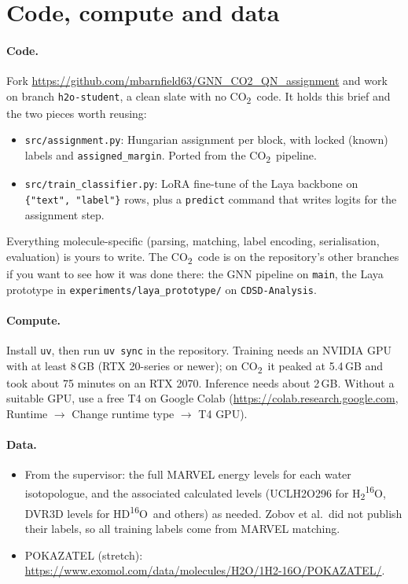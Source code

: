 \documentclass[11pt,a4paper]{article}
\newcommand{\water}{H\textsubscript{2}\textsuperscript{16}O}
\newcommand{\hdo}{HD\textsuperscript{16}O}
\newcommand{\cotwo}{CO\textsubscript{2}}
\begin{document}
\section{Code, compute and data}

\paragraph{Code.} Fork \url{https://github.com/mbarnfield63/GNN_CO2_QN_assignment} and work on branch \texttt{h2o-student}, a clean slate with no \cotwo\ code. It holds this brief and the two pieces worth reusing:
\begin{itemize}
  \item \texttt{src/assignment.py}: Hungarian assignment per block, with locked (known) labels and \texttt{assigned\_margin}. Ported from the \cotwo\ pipeline.
  \item \texttt{src/train\_classifier.py}: LoRA fine-tune of the Laya backbone on \texttt{\{"text", "label"\}} rows, plus a \texttt{predict} command that writes logits for the assignment step.
\end{itemize}
Everything molecule-specific (parsing, matching, label encoding, serialisation, evaluation) is yours to write. The \cotwo\ code is on the repository's other branches if you want to see how it was done there: the GNN pipeline on \texttt{main}, the Laya prototype in \texttt{experiments/laya\_prototype/} on \texttt{CDSD-Analysis}.

\paragraph{Compute.} Install \texttt{uv}, then run \texttt{uv sync} in the repository. Training needs an NVIDIA GPU with at least 8\,GB (RTX 20-series or newer); on \cotwo\ it peaked at 5.4\,GB and took about 75 minutes on an RTX 2070. Inference needs about 2\,GB. Without a suitable GPU, use a free T4 on Google Colab (\url{https://colab.research.google.com}, Runtime $\rightarrow$ Change runtime type $\rightarrow$ T4 GPU).

\paragraph{Data.}
\begin{itemize}
  \item From the supervisor: the full MARVEL energy levels for each water isotopologue, and the associated calculated levels (UCLH2O296 for \water, DVR3D levels for \hdo\ and others) as needed. Zobov et al.\ did not publish their labels, so all training labels come from MARVEL matching.
  \item POKAZATEL (stretch): \url{https://www.exomol.com/data/molecules/H2O/1H2-16O/POKAZATEL/}.
\end{itemize}
\end{document}
